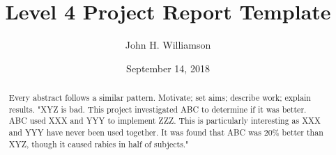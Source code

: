 \documentclass{l4proj}
\begin{document}
\title{Level 4 Project Report Template}
\author{John H. Williamson}
\date{September 14, 2018}

\maketitle

\begin{abstract}
    Every abstract follows a similar pattern. Motivate; set aims; describe work; explain results.
    "XYZ is bad. This project investigated ABC to determine if it was better. 
    ABC used XXX and YYY to implement ZZZ. This is particularly interesting as XXX and YYY have
    never been used together. It was found that  
    ABC was 20\% better than XYZ, though it caused rabies in half of subjects."


\end{abstract}


%
%
\educationalconsent
\tableofcontents





\end{document}
